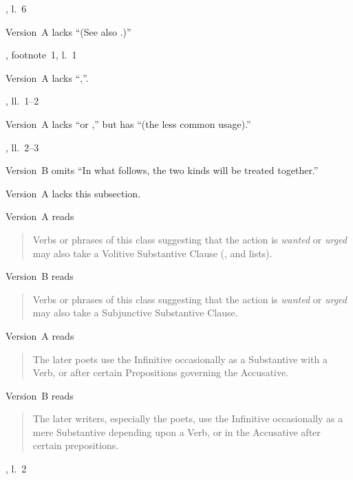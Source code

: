 \begin{variations}
\item[{\xref[\emph{a}]{550}, l.~6}]

Version~A lacks “(See also .)”

\item[{\xref{555}, footnote~1, l.~1}]

Version~A lacks “,”.

\item[{\xref{558}, ll.~1–2}]

Version~A lacks “or ,” but has “(the less common
usage).”

\item[{\xref{577}, ll.~2–3}]

Version~B omits “In what follows, the two kinds will be treated
together.”

\item[{\xref[\emph{a}]{577}}]

Version~A lacks this subsection.

\item[{\xref[\emph{e}]{585}}]

Version~A reads
\begin{quote}
Verbs or phrases of this class suggesting that the action is
\emph{wanted} or \emph{urged} may also take a Volitive Substantive
Clause (, and lists).
\end{quote}

Version~B reads
\begin{quote}
Verbs or phrases of this class suggesting that the action is
\emph{wanted} or \emph{urged} may also take a Subjunctive Substantive
Clause.
\end{quote}

\item[{\xref[3]{598}}]

Version~A reads
\begin{quote}
The later poets use the Infinitive occasionally as a Substantive with
a Verb, or after certain Prepositions governing the Accusative.
\end{quote}

Version~B reads
\begin{quote}
The later writers, especially the poets, use the Infinitive
occasionally as a mere Substantive depending upon a Verb, or in the
Accusative after certain prepositions.
\end{quote}

\item[{\xref[2]{605}, l.~2}]


\end{variations}
